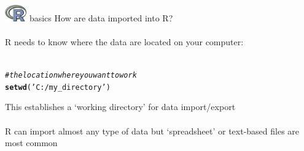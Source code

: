 \documentclass[xcolor=svgnames]{beamer}\usepackage[]{graphicx}\usepackage[]{color}
\makeatletter
\newcommand{\hlstr}[1]{\textcolor[rgb]{0.192,0.494,0.8}{#1}}%
\newcommand{\hlcom}[1]{\textcolor[rgb]{0.678,0.584,0.686}{\textit{#1}}}%
\newcommand{\hlstd}[1]{\textcolor[rgb]{0.345,0.345,0.345}{#1}}%
\newcommand{\hlkwd}[1]{\textcolor[rgb]{0.737,0.353,0.396}{\textbf{#1}}}%
\newenvironment{kframe}{%
 \def\at@end@of@kframe{}%
 \ifinner\ifhmode%
  \def\at@end@of@kframe{\end{minipage}}%
  \begin{minipage}{\columnwidth}%
 \fi\fi%
 \def\FrameCommand##1{\hskip\@totalleftmargin \hskip-\fboxsep
 \colorbox{shadecolor}{##1}\hskip-\fboxsep
     \hskip-\linewidth \hskip-\@totalleftmargin \hskip\columnwidth}%
 \MakeFramed {\advance\hsize-\width
   \@totalleftmargin\z@ \linewidth\hsize
   \@setminipage}}%
 {\par\unskip\endMakeFramed%
 \at@end@of@kframe}
\newenvironment{knitrout}{}{} %
\makeatother
\begin{document}
\begin{frame}[t,fragile]{\includegraphics[width=0.07\textwidth]{Rlogo.jpg} \hspace{0.01in} basics}
How are data imported into R?\\~\\
R needs to know where the data are located on your computer:\\~\\
\begin{knitrout}\scriptsize
{}\color{fgcolor}\begin{kframe}
\begin{alltt}
\hlcom{# the location where you want to work}
\hlkwd{setwd}\hlstd{(}\hlstr{'C:/my_directory'}\hlstd{)}
\end{alltt}
\end{kframe}
\end{knitrout}
\vspace{0.2in}
This establishes a `working directory' for data import/export\\~\\
R can import almost any type of data but `spreadsheet' or text-based files are most common
\end{frame}
\end{document}
